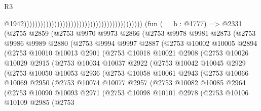 \begin{lexlean}{R3}
\begin{coremodule}
                                                                                          @1942)))))))))))))))))))))))))))))))))))))))))))
    (fun (__b : @1777) =>
    @2331
      (@2755
        @2859
        (@2753
          @9970
          @9973
          @2866
          (@2753
            @9978
            @9981
            @2873
            (@2753
              @9986
              @9989
              @2880
              (@2753
                @9994
                @9997
                @2887
                (@2753
                  @10002
                  @10005
                  @2894
                  (@2753
                    @10010
                    @10013
                    @2901
                    (@2753
                      @10018
                      @10021
                      @2908
                      (@2753
                        @10026
                        @10029
                        @2915
                        (@2753
                          @10034
                          @10037
                          @2922
                          (@2753
                            @10042
                            @10045
                            @2929
                            (@2753
                              @10050
                              @10053
                              @2936
                              (@2753
                                @10058
                                @10061
                                @2943
                                (@2753
                                  @10066
                                  @10069
                                  @2950
                                  (@2753
                                    @10074
                                    @10077
                                    @2957
                                    (@2753
                                      @10082
                                      @10085
                                      @2964
                                      (@2753
                                        @10090
                                        @10093
                                        @2971
                                        (@2753
                                          @10098
                                          @10101
                                          @2978
                                          (@2753
                                            @10106
                                            @10109
                                            @2985
                                            (@2753

\end{coremodule}
\end{lexlean}
